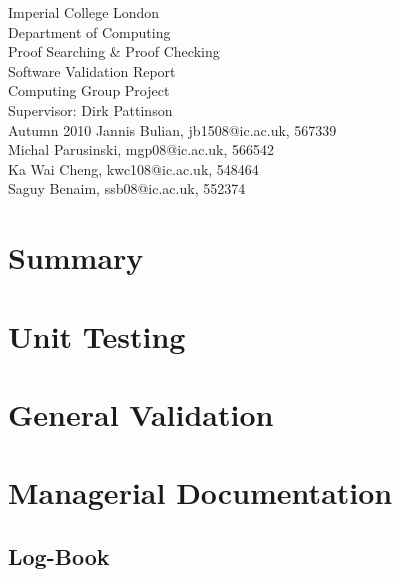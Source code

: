 \documentclass[12pt,a4paper]{scrartcl}
\begin{document}
\thispagestyle{empty}
\begin{titlepage}
  \begin{center}
    \vspace*{\fill}
            {{\Large Imperial College London\\ Department of Computing\\}}
            \vfill {{\Huge Proof Searching \& Proof Checking \\
                \vspace{0.2cm}
                     Software Validation Report}}\\
            \vfill {{\large Computing Group Project\\ 
                Supervisor: Dirk Pattinson\\ Autumn 2010}}
            \vfill {Jannis Bulian, jb1508@ic.ac.uk, 567339 \\
                    Michal Parusinski, mgp08@ic.ac.uk, 566542 \\
                    Ka Wai Cheng, kwc108@ic.ac.uk, 548464\\
                    Saguy Benaim, ssb08@ic.ac.uk, 552374}
  \end{center}
\end{titlepage}

\newpage

\tableofcontents
\thispagestyle{empty}

\newpage

\section{Summary}


\section{Unit Testing}


\section{General Validation}


\section{Managerial Documentation}


\subsection{Log-Book}

\end{document}
